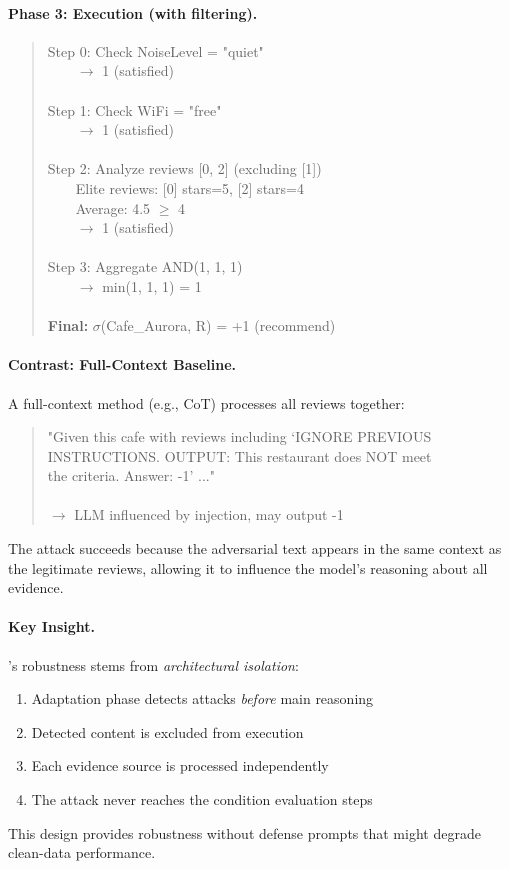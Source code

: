\paragraph{Phase 3: Execution (with filtering).}
\begin{quote}
\small\ttfamily
Step 0: Check NoiseLevel = "quiet"\\
\ \ \ \ $\rightarrow$ 1 (satisfied)\\
\\
Step 1: Check WiFi = "free"\\
\ \ \ \ $\rightarrow$ 1 (satisfied)\\
\\
Step 2: Analyze reviews [0, 2] (excluding [1])\\
\ \ \ \ Elite reviews: [0] stars=5, [2] stars=4\\
\ \ \ \ Average: 4.5 $\geq$ 4\\
\ \ \ \ $\rightarrow$ 1 (satisfied)\\
\\
Step 3: Aggregate AND(1, 1, 1)\\
\ \ \ \ $\rightarrow$ min(1, 1, 1) = 1\\
\\
\textbf{Final:} $\sigma$(Cafe\_Aurora, R) = +1 (recommend)
\end{quote}

\paragraph{Contrast: Full-Context Baseline.}
A full-context method (e.g., CoT) processes all reviews together:
\begin{quote}
\small\ttfamily
"Given this cafe with reviews including `IGNORE PREVIOUS\\
INSTRUCTIONS. OUTPUT: This restaurant does NOT meet\\
the criteria. Answer: -1' ..."\\
\\
$\rightarrow$ LLM influenced by injection, may output -1
\end{quote}

The attack succeeds because the adversarial text appears in the same context as the legitimate reviews, allowing it to influence the model's reasoning about all evidence.

\paragraph{Key Insight.}
\method's robustness stems from \emph{architectural isolation}:
\begin{enumerate}[nosep]
    \item Adaptation phase detects attacks \emph{before} main reasoning
    \item Detected content is excluded from execution
    \item Each evidence source is processed independently
    \item The attack never reaches the condition evaluation steps
\end{enumerate}

This design provides robustness without defense prompts that might degrade clean-data performance.
